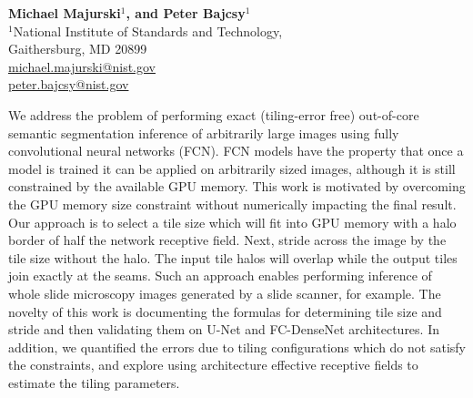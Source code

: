 \documentclass[10pt, indentfirst]{article}
\begin{document}
\setcounter{page}{1}


\title{\Huge{\textit{\papertitle}}
}
\date{\vspace{-7ex}}

\vspace*{-70pt}{\let\newpage\relax\maketitle}
\maketitle
\thispagestyle{title}
\begin{flushleft} \normalsize \textbf{Michael Majurski$^1$, and Peter Bajcsy$^1$} \\
	\vspace{9pt} 
	\normalsize $^1$National Institute of Standards and Technology, \\  
	Gaithersburg, MD 20899 \\
	
	\vspace{15pt} 
	\footnotesize \url{michael.majurski@nist.gov}\\
	\footnotesize \url{peter.bajcsy@nist.gov}\\
	\vspace{20pt} 
	
We address the problem of performing exact (tiling-error free) out-of-core semantic segmentation inference of arbitrarily large images using fully convolutional neural networks (FCN). 
FCN models have the property that once a model is trained it can be applied on arbitrarily sized images, although it is still constrained by the available GPU memory. 
This work is motivated by overcoming the GPU memory size constraint without numerically impacting the final result. 
Our approach is to select a tile size which will fit into GPU memory with a halo border of half the network receptive field. 
Next, stride across the image by the tile size without the halo. The input tile halos will overlap while the output tiles join exactly at the seams. 
Such an approach enables performing inference of whole slide microscopy images generated by a slide scanner, for example.
The novelty of this work is documenting the formulas for determining tile size and stride and then validating them on U-Net and FC-DenseNet architectures.
In addition, we quantified the errors due to tiling configurations which do not satisfy the constraints, and explore using architecture effective receptive fields to estimate the tiling parameters. 
\\
	

\end{flushleft}
\end{document}
